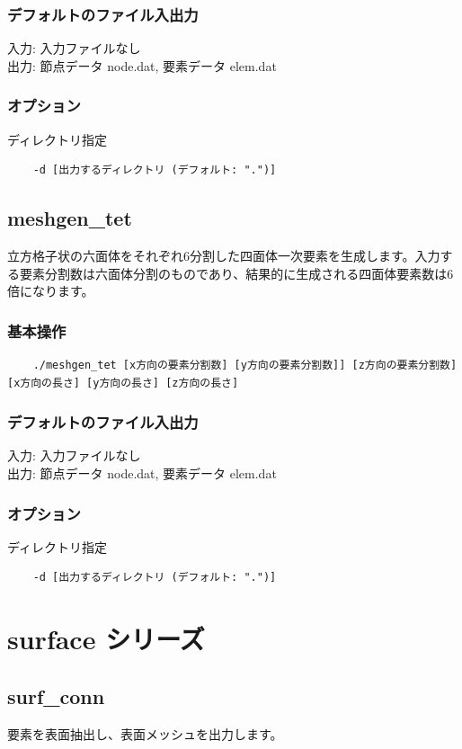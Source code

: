 \documentclass[8pt,a4paper]{article}
\begin{document}
\subsubsection*{デフォルトのファイル入出力}
入力: 入力ファイルなし \\ \noindent
出力: 節点データ node.dat, 要素データ elem.dat

\subsubsection*{オプション}
ディレクトリ指定
\begin{verbatim}
    -d [出力するディレクトリ (デフォルト: ".")]
\end{verbatim}

\subsection{meshgen\_tet}
立方格子状の六面体をそれぞれ6分割した四面体一次要素を生成します。入力する要素分割数は六面体分割のものであり、結果的に生成される四面体要素数は6倍になります。
\subsubsection*{基本操作}
\begin{verbatim}
    ./meshgen_tet [x方向の要素分割数] [y方向の要素分割数]] [z方向の要素分割数] [x方向の長さ] [y方向の長さ] [z方向の長さ] 
\end{verbatim}

\subsubsection*{デフォルトのファイル入出力}
入力: 入力ファイルなし \\ \noindent
出力: 節点データ node.dat, 要素データ elem.dat

\subsubsection*{オプション}
ディレクトリ指定
\begin{verbatim}
    -d [出力するディレクトリ (デフォルト: ".")]
\end{verbatim}

\section{surface シリーズ}
\subsection{surf\_conn}
要素を表面抽出し、表面メッシュを出力します。
\end{document}
